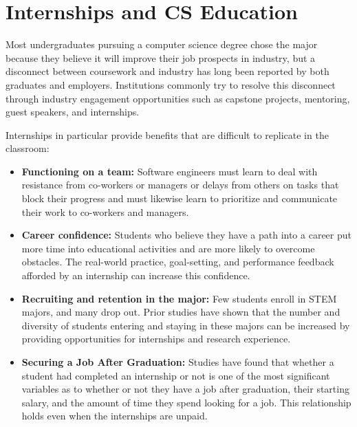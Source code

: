 \section{Internships and CS Education}

Most undergraduates pursuing a computer science degree chose the major because they believe it will improve their job prospects in industry, \cite{nortonPerceivedBenefitsUndergraduate2017,alshahraniUsingSocialCognitive2018,helpsStudentExpectationsComputing2005} but a disconnect between coursework and industry has long been reported by both graduates \cite{begelStrugglesNewCollege2008,craigListeningEarlyCareer2018,kapoorUnderstandingCSUndergraduate2019} and employers. \cite{begelStrugglesNewCollege2008} Institutions commonly try to resolve this disconnect through industry engagement opportunities such as capstone projects, mentoring, guest speakers, and internships.

Internships in particular provide benefits that are difficult to replicate in the classroom:

\begin{itemize}
    \item \textbf{Functioning on a team:}
    Software engineers must learn to deal with resistance from co-workers or managers or delays from others on tasks that block their progress and must likewise learn to prioritize and communicate their work to co-workers and managers. \cite{beaubouefComputerScienceCurriculum2011}
    
    \item \textbf{Career confidence:}
    Students who believe they have a path into a career put more time into educational activities and are more likely to overcome obstacles. The real-world practice, goal-setting, and performance feedback afforded by an internship can increase this confidence. \cite{lentUnifyingSocialCognitive1994} 

    \item \textbf{Recruiting and retention in the major:}
    Few students enroll in STEM majors, and many drop out. \cite{chenSTEMAttritionCollege2013} Prior studies have shown that the number and diversity of students entering and staying in these majors can be increased by providing opportunities for internships \cite{frylingCatchEmEarly2018} and research experience. \cite{dahlbergImprovingRetentionGraduate2008, tashakkoriEarlyParticipationCS2011}

    \item \textbf{Securing a Job After Graduation:}
    Studies have found that whether a student had completed an internship or not is one of the most significant variables as to whether or not they have a job after graduation, \cite{callananAssessingRoleInternships2004, jonesTransformingCurriculumPreparing2002, knouseRelationCollegeInternships1999, saltikoffPositiveImplicationsInternships2017} their starting salary, and the amount of time they spend looking for a job. \cite{gaultUndergraduateBusinessInternships2000} This relationship holds even when the internships are unpaid. \cite{saltikoffPositiveImplicationsInternships2017}
\end{itemize}

